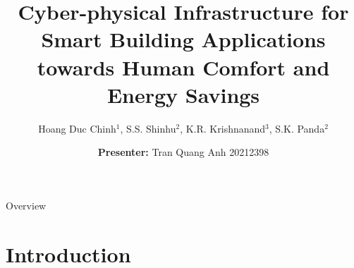 \documentclass[aspectratio=169]{beamer}
\title[EE2023 - Technical Writing and Presentation]{Cyber-physical Infrastructure for Smart Building Applications towards Human Comfort and Energy Savings} %
\author[Tran Quang Anh 20212398]{Hoang Duc Chinh$^1$, S.S. Shinhu$^2$, K.R. Krishnanand$^3$, S.K. Panda$^2$}
\institute[HUST] %
{
$^1$Hanoi University of Science and Technology, Viet Nam \\
$^2$National University of Singapore, Singapore \\ %
$^3$Berkeley Education Alliance for Research in Singapore (BEARS), Singapore
\medskip
\textbf{\\ ISSN 1859-0551} %
}
\date[Instructor: Tran Thanh Son]{\small \textbf{Presenter:} Tran Quang Anh 20212398} %
\begin{document}
\begin{frame}
\titlepage %
\end{frame}

\begin{frame}{Overview} %
\tableofcontents %
\end{frame}


\section{Introduction} %

\end{document}
